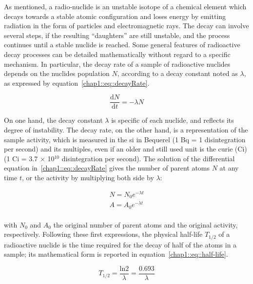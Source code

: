 As mentioned, a radio-nuclide is an unstable isotope of a chemical element which decays towards a stable atomic configuration and loses energy by emitting radiation in the form of particles and electromagnetic rays. The decay can involve several steps, if the resulting \enquote{daughters} are still unstable, and the process continues until a stable nuclide is reached. 
Some general features of radioactive decay processes can be detailed mathematically without regard to a specific mechanism. In particular, the decay rate of a sample of radioactive nuclides depends on the nuclides population $N$, according to a decay constant noted as $\lambda$, as expressed by equation~\ref{chap1::eq::decayRate}. 

\begin{equation}\label{chap1::eq::decayRate}
\frac{\mathrm{d}N}{\mathrm{d}t} = -\lambda N 
\end{equation} 

On one hand, the decay constant $\lambda$ is specific of each nuclide, and reflects its degree of instability. The decay rate, on the other hand, is a representation of the sample activity, which is measured in the \gls{si} in Bequerel (1 Bq = 1 disintegration per second) and its multiples, even if an older and still used unit is the curie (Ci) (1 Ci = 3.7 $\times$ 10$^{10}$ disintegration per second). The solution of the differential equation in~\ref{chap1::eq::decayRate} gives the number of parent atoms $N$ at any time $t$, or the activity by multiplying both side by $\lambda$:

\begin{equation}\label{chap1::eq::parentAtoms}
\begin{split}
N = N_{0}e^{-\lambda t}  \\
A = A_{0}e^{-\lambda t}  \\
\end{split}
\end{equation} 

with $N_0$ and $A_0$ the original number of parent atoms and the original activity, respectively. Following these first expressions, the physical half-life $T_{1/2}$ of a radioactive nuclide is the time required for the decay of half of the atoms in a sample; its mathematical form is reported in equation~\ref{chap1::eq::half-life}.

\begin{equation}\label{chap1::eq::half-life}
T_{1/2} = \frac{\mathrm{ln}2}{\lambda} = \frac{0.693}{\lambda}
\end{equation} 

